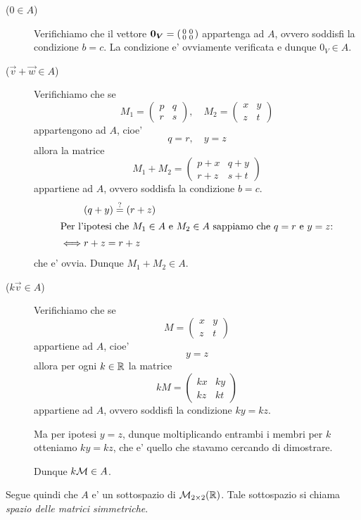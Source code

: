 \begin{example}
    \begin{description}
        \item[($0 \in A$)] Verifichiamo che il vettore $\vec{0_V} = \begin{psmallmatrix}0 & 0 \\ 0 & 0 \end{psmallmatrix}$ appartenga ad $A$, ovvero soddisfi la condizione $b = c$. La condizione e' ovviamente verificata e dunque $0_V \in A$.
        \item[($\vec v + \vec w \in A$)] Verifichiamo che se \[
            M_1 = \begin{pmatrix}
                p & q \\ r & s
            \end{pmatrix}, \quad M_2 = \begin{pmatrix}
                x & y \\ z & t
            \end{pmatrix} 
        \] appartengono ad $A$, cioe' \[
            q = r, \quad y = z
        \] allora la matrice \[
            M_1 + M_2 = \begin{pmatrix}
                p+x & q+y \\ r+z & s+t
            \end{pmatrix}
        \] appartiene ad $A$, ovvero soddisfa la condizione $b = c$. \begin{align*}
            &(q+y) \iseq (r+z) \\
            \intertext{Per l'ipotesi che $M_1 \in A$ e $M_2 \in A$ sappiamo che $q = r$ e $y = z$:}
            \iff &r + z = r+z
        \end{align*}
        che e' ovvia. Dunque $M_1 + M_2 \in A$.
        \item[($k\vec v  \in A$)] Verifichiamo che se \[
            M = \begin{pmatrix}
                x & y \\ z & t
            \end{pmatrix} 
        \] appartiene ad $A$, cioe' \[
            y = z
        \] allora per ogni $k \in \R$ la matrice \[
            kM = \begin{pmatrix}
                kx & ky \\ kz & kt
            \end{pmatrix} 
        \]
        appartiene ad $A$, ovvero soddisfi la condizione $ky = kz$. 
        
        Ma per ipotesi $y = z$, dunque moltiplicando entrambi i membri per $k$ otteniamo $ky = kz$, che e' quello che stavamo cercando di dimostrare.

        Dunque $k\M \in A$.
    \end{description}

    Segue quindi che $A$ e' un sottospazio di $\M_{2 \times 2}(\R)$. Tale sottospazio si chiama \emph{spazio delle matrici simmetriche}.
\end{example}

